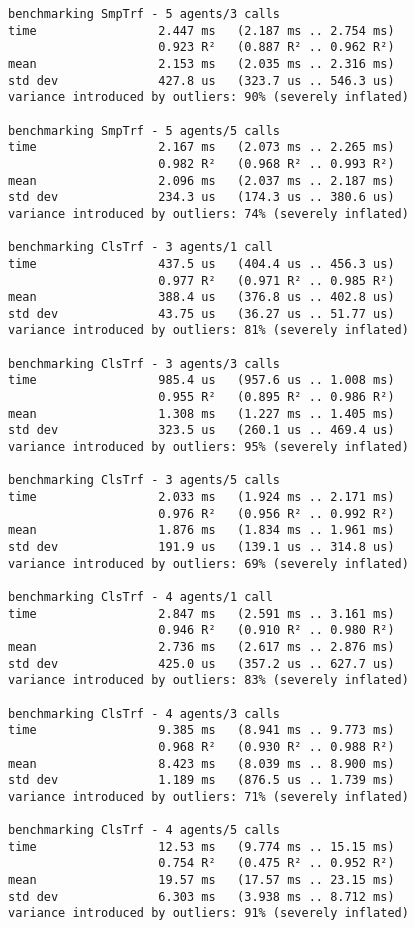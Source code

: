 \begin{verbatim}
benchmarking SmpTrf - 5 agents/3 calls
time                 2.447 ms   (2.187 ms .. 2.754 ms)
                     0.923 R²   (0.887 R² .. 0.962 R²)
mean                 2.153 ms   (2.035 ms .. 2.316 ms)
std dev              427.8 us   (323.7 us .. 546.3 us)
variance introduced by outliers: 90% (severely inflated)

benchmarking SmpTrf - 5 agents/5 calls
time                 2.167 ms   (2.073 ms .. 2.265 ms)
                     0.982 R²   (0.968 R² .. 0.993 R²)
mean                 2.096 ms   (2.037 ms .. 2.187 ms)
std dev              234.3 us   (174.3 us .. 380.6 us)
variance introduced by outliers: 74% (severely inflated)

benchmarking ClsTrf - 3 agents/1 call
time                 437.5 us   (404.4 us .. 456.3 us)
                     0.977 R²   (0.971 R² .. 0.985 R²)
mean                 388.4 us   (376.8 us .. 402.8 us)
std dev              43.75 us   (36.27 us .. 51.77 us)
variance introduced by outliers: 81% (severely inflated)

benchmarking ClsTrf - 3 agents/3 calls
time                 985.4 us   (957.6 us .. 1.008 ms)
                     0.955 R²   (0.895 R² .. 0.986 R²)
mean                 1.308 ms   (1.227 ms .. 1.405 ms)
std dev              323.5 us   (260.1 us .. 469.4 us)
variance introduced by outliers: 95% (severely inflated)

benchmarking ClsTrf - 3 agents/5 calls
time                 2.033 ms   (1.924 ms .. 2.171 ms)
                     0.976 R²   (0.956 R² .. 0.992 R²)
mean                 1.876 ms   (1.834 ms .. 1.961 ms)
std dev              191.9 us   (139.1 us .. 314.8 us)
variance introduced by outliers: 69% (severely inflated)

benchmarking ClsTrf - 4 agents/1 call
time                 2.847 ms   (2.591 ms .. 3.161 ms)
                     0.946 R²   (0.910 R² .. 0.980 R²)
mean                 2.736 ms   (2.617 ms .. 2.876 ms)
std dev              425.0 us   (357.2 us .. 627.7 us)
variance introduced by outliers: 83% (severely inflated)

benchmarking ClsTrf - 4 agents/3 calls
time                 9.385 ms   (8.941 ms .. 9.773 ms)
                     0.968 R²   (0.930 R² .. 0.988 R²)
mean                 8.423 ms   (8.039 ms .. 8.900 ms)
std dev              1.189 ms   (876.5 us .. 1.739 ms)
variance introduced by outliers: 71% (severely inflated)

benchmarking ClsTrf - 4 agents/5 calls
time                 12.53 ms   (9.774 ms .. 15.15 ms)
                     0.754 R²   (0.475 R² .. 0.952 R²)
mean                 19.57 ms   (17.57 ms .. 23.15 ms)
std dev              6.303 ms   (3.938 ms .. 8.712 ms)
variance introduced by outliers: 91% (severely inflated)


\end{verbatim}
